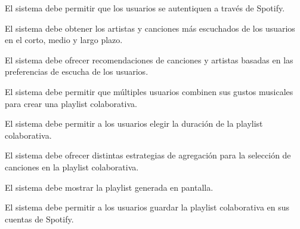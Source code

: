 
\begin{functional}
    \item El sistema debe permitir que los usuarios se autentiquen a través de Spotify.
    \item El sistema debe obtener los artistas y canciones más escuchados de los usuarios en el corto, medio y largo plazo.
    \item El sistema debe ofrecer recomendaciones de canciones y artistas basadas en las preferencias de escucha de los usuarios.
    \item El sistema debe permitir que múltiples usuarios combinen sus gustos musicales para crear una playlist colaborativa.
    \item El sistema debe permitir a los usuarios elegir la duración de la playlist colaborativa.
    \item El sistema debe ofrecer distintas estrategias de agregación para la selección de canciones en la playlist colaborativa.
    \item El sistema debe mostrar la playlist generada en pantalla.
    \item El sistema debe permitir a los usuarios guardar la playlist colaborativa en sus cuentas de Spotify.
\end{functional}